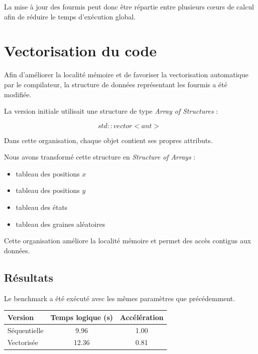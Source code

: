 \documentclass[11pt]{article}
\begin{document}
La mise à jour des fourmis peut donc être répartie entre plusieurs cœurs de calcul afin de réduire le temps d'exécution global.

\section{Vectorisation du code}

Afin d'améliorer la localité mémoire et de favoriser la vectorisation automatique par le compilateur, la structure de données représentant les fourmis a été modifiée.

La version initiale utilisait une structure de type \textit{Array of Structures} :

\[
std::vector<ant>
\]

Dans cette organisation, chaque objet contient ses propres attributs.

Nous avons transformé cette structure en \textit{Structure of Arrays} :

\begin{itemize}
\item tableau des positions $x$
\item tableau des positions $y$
\item tableau des états
\item tableau des graines aléatoires
\end{itemize}

Cette organisation améliore la localité mémoire et permet des accès contigus aux données.

\subsection{Résultats}

Le benchmark a été exécuté avec les mêmes paramètres que précédemment.

\begin{center}

\begin{tabular}{lcc}

\toprule
Version & Temps logique (s) & Accélération \\
\midrule
Séquentielle & 9.96 & 1.00 \\
Vectorisée & 12.36 & 0.81 \\
\bottomrule

\end{tabular}

\end{center}
\end{document}
